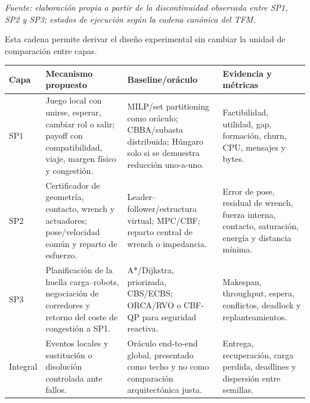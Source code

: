 \documentclass[10pt,letterpaper]{article}
\newcommand{\sourcecap}[1]{\par{\setstretch{1}\fontsize{7.0}{7.7}\selectfont\itshape\centering Fuente: #1\par}}
\begin{document}
\begin{center}
\end{center}
\sourcecap{elaboración propia a partir de la discontinuidad observada entre SP1, SP2 y SP3; estados de ejecución según la cadena canónica del TFM.}

Esta cadena permite derivar el diseño experimental sin cambiar la unidad de comparación entre capas.
\renewcommand{\arraystretch}{1.08}
\setlength{\tabcolsep}{2.6pt}
\fontsize{7.15}{7.75}\selectfont
\begin{tabularx}{\linewidth}{C{11mm} L{34mm} L{43mm} Y}
\toprule
\textbf{Capa} & \textbf{Mecanismo propuesto} & \textbf{Baseline/oráculo} & \textbf{Evidencia y métricas}\\
\midrule
SP1 & Juego local con unirse, esperar, cambiar rol o salir; payoff con compatibilidad, viaje, margen físico y congestión. & MILP/set partitioning como oráculo; CBBA/subasta distribuida; Húngaro solo si se demuestra reducción uno-a-uno. & Factibilidad, utilidad, gap, formación, churn, CPU, mensajes y bytes.\\
SP2 & Certificador de geometría, contacto, wrench y actuadores; pose/velocidad común y reparto de esfuerzo. & Leader--follower/estructura virtual; MPC/CBF; reparto central de wrench o impedancia. & Error de pose, residual de wrench, fuerza interna, contacto, saturación, energía y distancia mínima.\\
SP3 & Planificación de la huella carga--robots, negociación de corredores y retorno del coste de congestión a SP1. & A*/Dijkstra, priorizada, CBS/ECBS; ORCA/RVO o CBF-QP para seguridad reactiva. & Makespan, throughput, espera, conflictos, deadlock y replanteamientos.\\
Integral & Eventos locales y sustitución o disolución controlada ante fallos. & Oráculo end-to-end global, presentado como techo y no como comparación arquitectónica justa. & Entrega, recuperación, carga perdida, deadlines y dispersión entre semillas.\\
\bottomrule
\end{tabularx}
\normalsize
\end{document}
